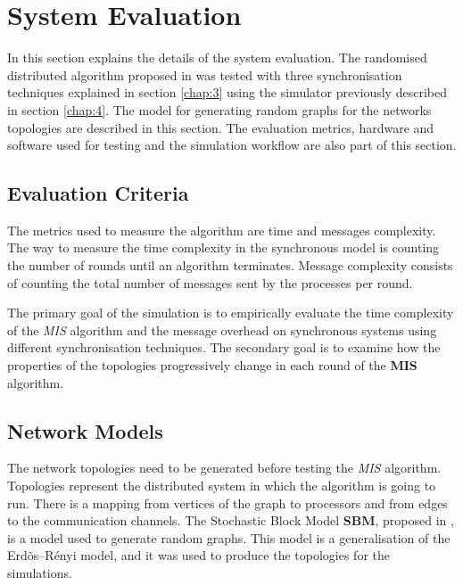 \section{System Evaluation}
\label{chap:5}

In this section explains the details of the system evaluation. The randomised distributed algorithm proposed in \cite{yves2009optimal} was tested with three synchronisation techniques explained in section \ref{chap:3} using the simulator previously described in section \ref{chap:4}. The model for generating random graphs for the networks topologies are described in this section. The evaluation metrics, hardware and software used for testing and the simulation workflow are also part of this section.   


\subsection{Evaluation Criteria}



The metrics used to measure the algorithm are time and messages complexity. The way to measure the time complexity in the synchronous model is counting the number of rounds until an algorithm terminates. Message complexity consists of counting the total number of messages sent by the processes per round.

The primary goal of the simulation is to empirically evaluate the time complexity of the \textit{MIS} algorithm and the message overhead on synchronous systems using different synchronisation techniques. The secondary goal is to examine how the properties of the topologies progressively change in each round of the \textbf{MIS} algorithm.


\subsection{Network Models}
\label{sec:topology}


The network topologies need to be generated before testing the \textit{MIS} algorithm. Topologies represent the distributed system in which the algorithm is going to run. There is a mapping from vertices of the graph to processors and from edges to the communication channels.  The Stochastic Block Model \textbf{SBM}, proposed in \cite{holland1983stochastic},  is a model used to generate random graphs. This model is a generalisation of the Erd\~os--R\'enyi model, and it was used to produce the topologies for the simulations. 

